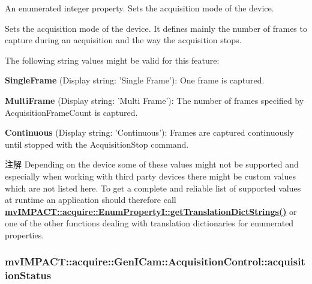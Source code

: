 An enumerated integer property. Sets the acquisition mode of the device. 

Sets the acquisition mode of the device. It defines mainly the number of frames to capture during an acquisition and the way the acquisition stops.

The following string values might be valid for this feature\+:
\begin{DoxyItemize}
\item {\bfseries Single\+Frame} (Display string\+: 'Single Frame')\+: One frame is captured.
\item {\bfseries Multi\+Frame} (Display string\+: 'Multi Frame')\+: The number of frames specified by Acquisition\+Frame\+Count is captured.
\item {\bfseries Continuous} (Display string\+: 'Continuous')\+: Frames are captured continuously until stopped with the Acquisition\+Stop command.
\end{DoxyItemize}

\begin{DoxyNote}{注解}
Depending on the device some of these values might not be supported and especially when working with third party devices there might be custom values which are not listed here. To get a complete and reliable list of supported values at runtime an application should therefore call {\bfseries \hyperlink{classmv_i_m_p_a_c_t_1_1acquire_1_1_enum_property_i_a0ba6ccbf5ee69784d5d0b537924d26b6}{mv\+I\+M\+P\+A\+C\+T\+::acquire\+::\+Enum\+Property\+I\+::get\+Translation\+Dict\+Strings()}} or one of the other functions dealing with translation dictionaries for enumerated properties. 
\end{DoxyNote}
\hypertarget{classmv_i_m_p_a_c_t_1_1acquire_1_1_gen_i_cam_1_1_acquisition_control_a44d19fa3bc046ac368cf2a6b5a3d2205}{
\subsubsection[{acquisition\+Status}]{ mv\+I\+M\+P\+A\+C\+T\+::acquire\+::\+Gen\+I\+Cam\+::\+Acquisition\+Control\+::acquisition\+Status}}\label{classmv_i_m_p_a_c_t_1_1acquire_1_1_gen_i_cam_1_1_acquisition_control_a44d19fa3bc046ac368cf2a6b5a3d2205}


